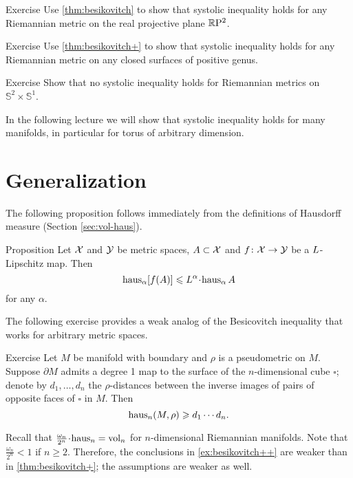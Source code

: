 \begin{thm}{Exercise}\label{ex:sysRP2}
Use \ref{thm:besikovitch} to show that systolic inequality holds for any Riemannian metric on  the real projective plane $\mathbb{R}\mathrm{P}^2$.
\end{thm}

\begin{thm}{Exercise}\label{ex:sysSg}
Use \ref{thm:besikovitch+} to show that systolic inequality holds for any Riemannian metric on any closed surfaces of positive genus.
\end{thm}

\begin{thm}{Exercise}\label{ex:sysS2xS1}
Show that no systolic inequality holds for Riemannian metrics on $\mathbb{S}^2\times\mathbb{S}^1$.
\end{thm}

In the following lecture we will show that systolic inequality holds for many manifolds, in particular for torus of arbitrary dimension.

\section{Generalization}\label{sec:hausdorff-measure}

The following proposition follows immediately from the definitions of Hausdorff measure (Section \ref{sec:vol-haus}).

\begin{thm}{Proposition}\label{prop:bilip-measure}
Let $\mathcal{X}$ and $\mathcal{Y}$ be metric spaces, $A\subset \mathcal{X}$
and
 $f\colon \mathcal{X}\to \mathcal{Y}$ be a $L$-Lipschitz map. 
Then 
\[\haus_\alpha [f(A)]\le \Lip^\alpha\cdot\haus_\alpha\, A\]
for any $\alpha$.
\end{thm}

The following exercise provides a weak analog of the Besicovitch inequality that works for arbitrary metric spaces.

\begin{thm}{Exercise}\label{ex:besikovitch++}
Let $M$ be manifold with boundary and $\rho$ is a pseudometric on $M$.
Suppose $\partial M$ admits a degree 1 map to the surface of the $n$-dimensional cube $\square$;
denote by $d_1,\dots, d_n$ the $\rho$-distances between the inverse images of pairs of opposite faces of $\square$ in $M$.
Then 
\[\mathrm{haus}_n(M,\rho)\geqslant d_1\cdots d_n.\]
\end{thm}


Recall that $\tfrac{\omega_n}{2^n}\cdot\haus_n=\vol_n$ for $n$-dimensional Riemannian manifolds.
Note that $\tfrac{\omega_n}{2^n}<1$ if $n\ge 2$.
Therefore, the conclusions in \ref{ex:besikovitch++} are weaker than in \ref{thm:besikovitch+}; the assumptions are weaker as well.

